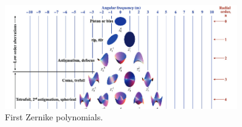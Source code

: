 \begin{figure}
    \centering
    \includegraphics[width=0.9\textwidth]{images/zernike_pols.png}
    \caption{First Zernike polynomials.}
    \label{fig:zernike_pols}
\end{figure}











